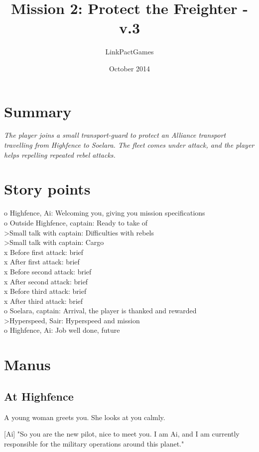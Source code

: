 \documentclass[a4paper,12pt]{article}
\begin{document}
\title{Mission 2: Protect the Freighter - v.3}
\author{LinkPactGames}
\date{October 2014}
\maketitle

\section{Summary}
\textit{The player joins a small transport-guard to protect an Alliance
transport travelling from Highfence to Soelara. The fleet comes under attack,
and the player helps repelling repeated rebel attacks.}

\section{Story points}
o Highfence, Ai: Welcoming you, giving you mission specifications\\
o Outside Highfence, captain: Ready to take of\\
\textgreater Small talk with captain: Difficulties with rebels\\
\textgreater Small talk with captain: Cargo\\
x Before first attack: brief\\
x After first attack: brief\\
x Before second attack: brief\\
x After second attack: brief\\
x Before third attack: brief\\
x After third attack: brief\\
o Soelara, captain: Arrival, the player is thanked and rewarded\\
\textgreater Hyperspeed, Sair: Hyperspeed and mission\\
o Highfence, Ai: Job well done, future

\section{Manus}

\subsection{At Highfence}

A young woman greets you. She looks at you calmly. 

[Ai] "So you are the new pilot, nice to meet you. I am Ai, and I am currently
responsible for the military operations around this planet."
\end{document}
